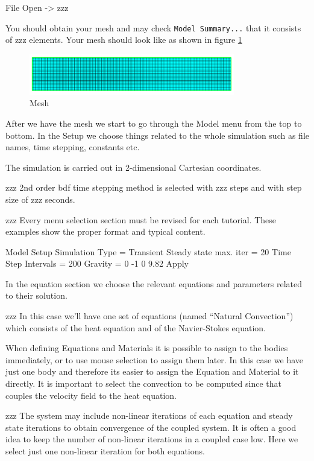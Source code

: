 \ttbegin
File 
  Open -> zzz
\ttend

You should obtain your mesh and may check \texttt{Model Summary...} that it consists of zzz elements.  Your mesh should look like as shown in figure \ref{fg:mesh}

\begin{figure}[H]
\centering
\includegraphics[width=0.8\textwidth]{mesh}
\caption{Mesh}\label{fg:mesh}
\end{figure}

After we have the mesh we start to go through the Model menu from the top to bottom.  In the Setup we choose things related to the whole simulation such as file names, time stepping, constants etc.  

The simulation is carried out in 2-dimensional Cartesian coordinates.

zzz 2nd order bdf time stepping method is selected with zzz steps and with step size of zzz seconds.

zzz Every menu selection section must be revised for each tutorial.  These examples show the proper format and typical content.

\ttbegin
Model
  Setup 
    Simulation Type = Transient
    Steady state max. iter = 20
    Time Step Intervals = 200
    Gravity = 0 -1 0 9.82
  Apply
\ttend

In the equation section we choose the relevant equations and parameters related to their solution. 

zzz In this case we'll have one set of equations (named ``Natural Convection'') which consists of the heat equation and of the Navier-Stokes equation.

When defining Equations and Materials it is possible to assign to the bodies immediately, or to use mouse selection to assign them later. In this case we have just one body and therefore its easier to assign the Equation and Material to it directly.  It is important to select the convection to be computed since that couples the velocity field to the heat equation.

zzz The system may include non-linear iterations of each equation and steady state iterations to obtain convergence of the coupled system. It is often a good idea to keep the number of non-linear iterations in a coupled case low. Here we select just one non-linear iteration for both equations.\\

